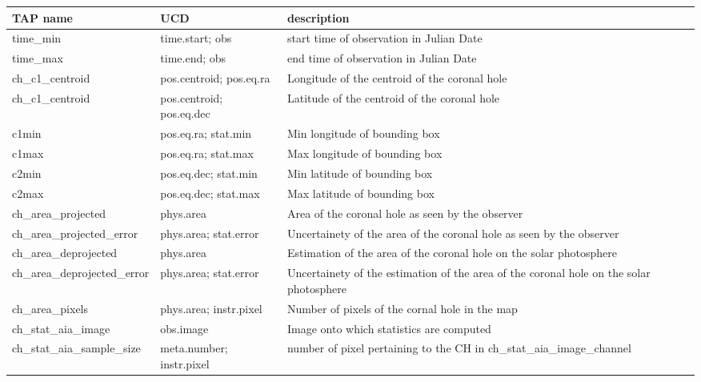 \documentclass{article}
\begin{document}
\begin{longtable}{|p{5cm}|p{2.5cm}|p{6.5cm}|}
\hline
TAP name                       & UCD                          &  description \\
\hline
time\_min                      & time.start; obs              & start time of observation in Julian Date \\
\hline
time\_max                      & time.end; obs                & end time of observation in Julian Date \\
\hline
ch\_c1\_centroid               & pos.centroid; pos.eq.ra       & Longitude of the centroid of the coronal hole \\
\hline
ch\_c1\_centroid               & pos.centroid; pos.eq.dec      & Latitude of the centroid of the coronal hole \\
\hline
c1min                          & pos.eq.ra; stat.min           & Min longitude of bounding box \\
\hline
c1max                          & pos.eq.ra; stat.max           & Max longitude of bounding box \\
\hline
c2min                          & pos.eq.dec; stat.min          & Min latitude of bounding box \\
\hline
c2max                          & pos.eq.dec; stat.max          & Max latitude of bounding box \\
\hline
ch\_area\_projected            & phys.area                    & Area of the coronal hole as seen by the observer \\
\hline
ch\_area\_projected\_error     & phys.area; stat.error        & Uncertainety of the area of the coronal hole as seen by the observer \\
\hline
ch\_area\_deprojected          & phys.area                    & Estimation of the area of the coronal hole on the solar photosphere \\
\hline
ch\_area\_deprojected\_error   & phys.area; stat.error        & Uncertainety of the estimation of the area of the coronal hole on the solar photosphere \\
\hline
ch\_area\_pixels               & phys.area; instr.pixel       & Number of pixels of the cornal hole in the map \\
\hline
ch\_stat\_aia\_image           & obs.image                    & Image onto which statistics are computed \\
\hline
ch\_stat\_aia\_sample\_size    & meta.number; instr.pixel     & number of pixel pertaining to the CH in ch\_stat\_aia\_image\_channel \\

\end{longtable}
\end{document}
